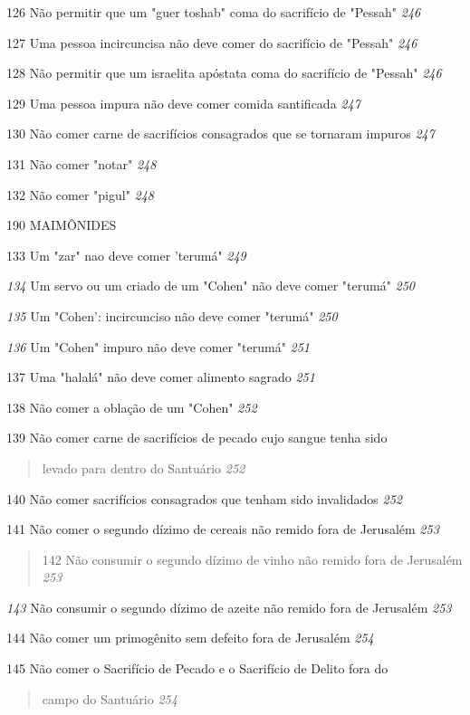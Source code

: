 126 Não permitir que um "guer toshab" coma do sacrifício de "Pessah"
\emph{246}

127 Uma pessoa incircuncisa não deve comer do sacrifício de "Pessah"
\emph{246}

128 Não permitir que um israelita apóstata coma do sacrifício de
"Pessah" \emph{246}

129 Uma pessoa impura não deve comer comida santificada \emph{247}

130 Não comer carne de sacrifícios consagrados que se tornaram impuros
\emph{247}

131 Não comer "notar" \emph{248}

132 Não comer "pigul" \emph{248}

190 MAIMÔNIDES

133 Um "zar" nao deve comer 'terumá" \emph{249}

\emph{134} Um servo ou um criado de um "Cohen" não deve comer "terumá"
\emph{250}

\emph{135} Um "Cohen': incircunciso não deve comer "terumá" \emph{250}

\emph{136} Um "Cohen" impuro não deve comer "terumá" \emph{251}

137 Uma "halalá" não deve comer alimento sagrado \emph{251}

138 Não comer a oblação de um "Cohen" \emph{252}

139 Não comer carne de sacrifícios de pecado cujo sangue tenha sido

\begin{quote}
levado para dentro do Santuário \emph{252}
\end{quote}

140 Não comer sacrifícios consagrados que tenham sido invalidados
\emph{252}

141 Não comer o segundo dízimo de cereais não remido fora de Jerusalém
\emph{253}

\begin{quote}
142 Não consumir o segundo dízimo de vinho não remido fora de Jeru­salém
\emph{253}
\end{quote}

\emph{143} Não consumir o segundo dízimo de azeite não remido fora de
Jerusalém \emph{253}

144 Não comer um primogênito sem defeito fora de Jerusalém \emph{254}

145 Não comer o Sacrifício de Pecado e o Sacrifício de Delito fora do

\begin{quote}
campo do Santuário \emph{254}
\end{quote}


